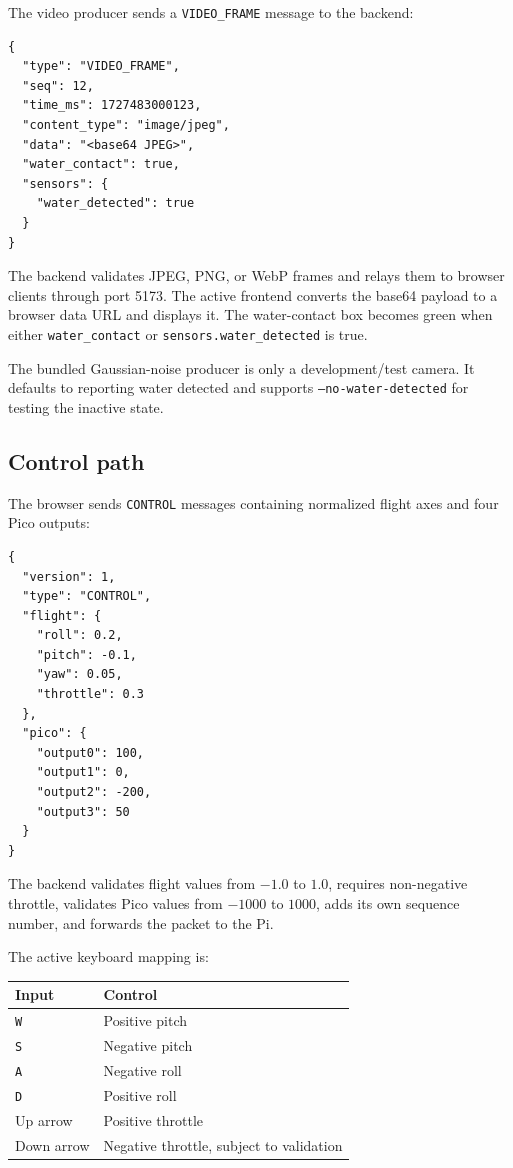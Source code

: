 \documentclass[11pt]{article}
\begin{document}
The video producer sends a \texttt{VIDEO\_FRAME} message to the backend:

\begin{lstlisting}
{
  "type": "VIDEO_FRAME",
  "seq": 12,
  "time_ms": 1727483000123,
  "content_type": "image/jpeg",
  "data": "<base64 JPEG>",
  "water_contact": true,
  "sensors": {
    "water_detected": true
  }
}
\end{lstlisting}

The backend validates JPEG, PNG, or WebP frames and relays them to browser
clients through port 5173. The active frontend converts the base64 payload to
a browser data URL and displays it. The water-contact box becomes green when
either \texttt{water\_contact} or \texttt{sensors.water\_detected} is true.

The bundled Gaussian-noise producer is only a development/test camera. It
defaults to reporting water detected and supports
\texttt{--no-water-detected} for testing the inactive state.

\subsection{Control path}

The browser sends \texttt{CONTROL} messages containing normalized flight axes
and four Pico outputs:

\begin{lstlisting}
{
  "version": 1,
  "type": "CONTROL",
  "flight": {
    "roll": 0.2,
    "pitch": -0.1,
    "yaw": 0.05,
    "throttle": 0.3
  },
  "pico": {
    "output0": 100,
    "output1": 0,
    "output2": -200,
    "output3": 50
  }
}
\end{lstlisting}

The backend validates flight values from \(-1.0\) to \(1.0\), requires
non-negative throttle, validates Pico values from \(-1000\) to \(1000\), adds
its own sequence number, and forwards the packet to the Pi.

The active keyboard mapping is:

\begin{center}
\begin{tabular}{ll}
\toprule
\textbf{Input} & \textbf{Control}\\
\midrule
\texttt{W} & Positive pitch\\
\texttt{S} & Negative pitch\\
\texttt{A} & Negative roll\\
\texttt{D} & Positive roll\\
Up arrow & Positive throttle\\
Down arrow & Negative throttle, subject to validation\\
\bottomrule
\end{tabular}
\end{center}
\end{document}
